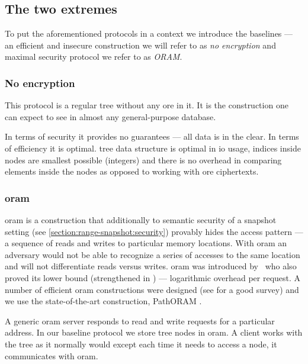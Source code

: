 \subsection{The two extremes}

	To put the aforementioned protocols in a context we introduce the baselines --- an efficient and insecure construction we will refer to as \emph{no encryption} and maximal security protocol we refer to as \emph{ORAM}.

	\subsubsection{No encryption}

		This protocol is a regular {\BPlus} tree \cite{b-tree} without any \acrshort{ore} in it.
		It is the construction one can expect to see in almost any general-purpose database.

		In terms of security it provides no guarantees --- all data is in the clear.
		In terms of efficiency it is optimal.
		{\BPlus} tree data structure is optimal in \acrshort{io} usage, indices inside nodes are smallest possible (integers) and there is no overhead in comparing elements inside the nodes as opposed to working with \acrshort{ore} ciphertexts.

	\subsubsection{\texorpdfstring{\acrshort{oram}}{ORAM}}\label{section:range-snapshot:oram}

		\acrfull{oram} is a construction that additionally to semantic security of a snapshot setting (see \cref{section:range-snapshot:security}) provably hides the access pattern --- a sequence of reads and writes to particular memory locations.
		With \acrshort{oram} an adversary would not be able to recognize a series of accesses to the same location and will not differentiate reads versus writes.
		\acrshort{oram} was introduced by~\textcite{oram-original} who also proved its lower bound (strengthened in \cite{oram-tighter-lower-bound}) --- logarithmic overhead per request.
		A number of efficient \acrshort{oram} constructions were designed (see \cite{oram-survey-feifei} for a good survey) and we use the state-of-the-art construction, PathORAM \cite{path-oram}.

		A generic \acrshort{oram} server responds to read and write requests for a particular address.
		In our baseline protocol we store {\BPlus} tree nodes in \acrshort{oram}.
		A client works with the tree as it normally would except each time it needs to access a node, it communicates with \acrshort{oram}.

